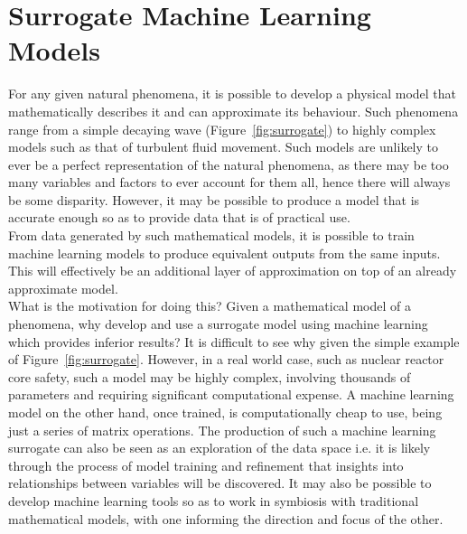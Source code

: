 \section{Surrogate Machine Learning Models} \label{Surrogate}

For any given natural phenomena, it is possible to develop a physical model that mathematically describes it and can approximate its behaviour. Such phenomena range from a simple decaying wave (Figure~\ref{fig:surrogate}) to highly complex models such as that of turbulent fluid movement. Such models are unlikely to ever be a perfect representation of the natural phenomena, as there may be too many variables and factors to ever account for them all, hence there will always be some disparity. However, it may be possible to produce a model that is accurate enough so as to provide data that is of practical use.
\\

\noindent
From data generated by such mathematical models, it is possible to train machine learning models to produce equivalent outputs from the same inputs. This will effectively be an additional layer of approximation on top of an already approximate model.
\\

\noindent
What is the motivation for doing this? Given a mathematical model of a phenomena, why develop and use a surrogate model using machine learning which provides inferior results? It is difficult to see why given the simple example of Figure~\ref{fig:surrogate}. However, in a real world case, such as nuclear reactor core safety, such a model may be highly complex, involving thousands of parameters and requiring significant computational expense. A machine learning model on the other hand, once trained, is computationally cheap to use, being just a series of matrix operations. The production of such a machine learning surrogate can also be seen as an exploration of the data space i.e. it is likely through the process of model training and refinement that insights into relationships between variables will be discovered. It may also be possible to develop machine learning tools so as to work in symbiosis with traditional mathematical models, with one informing the direction and focus of the other.
\\

